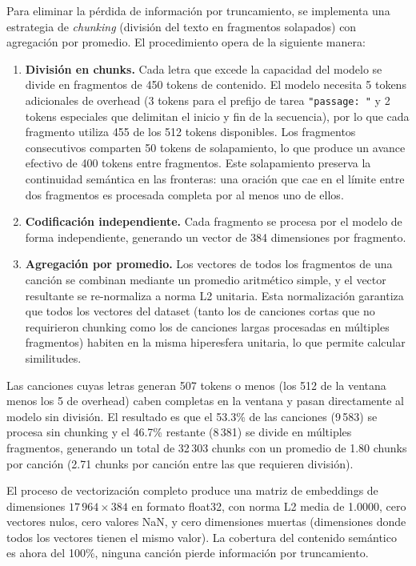 Para eliminar la pérdida de información por truncamiento, se implementa una estrategia de \textit{chunking} (división del texto en fragmentos solapados) con agregación por promedio. El procedimiento opera de la siguiente manera:

\begin{enumerate}[leftmargin=2em]
    \item \textbf{División en chunks.} Cada letra que excede la capacidad del modelo se divide en fragmentos de 450 tokens de contenido. El modelo necesita 5 tokens adicionales de overhead (3 tokens para el prefijo de tarea \texttt{"passage: "} y 2 tokens especiales que delimitan el inicio y fin de la secuencia), por lo que cada fragmento utiliza 455 de los 512 tokens disponibles. Los fragmentos consecutivos comparten 50 tokens de solapamiento, lo que produce un avance efectivo de 400 tokens entre fragmentos. Este solapamiento preserva la continuidad semántica en las fronteras: una oración que cae en el límite entre dos fragmentos es procesada completa por al menos uno de ellos.

    \item \textbf{Codificación independiente.} Cada fragmento se procesa por el modelo de forma independiente, generando un vector de 384 dimensiones por fragmento.

    \item \textbf{Agregación por promedio.} Los vectores de todos los fragmentos de una canción se combinan mediante un promedio aritmético simple, y el vector resultante se re-normaliza a norma L2 unitaria. Esta normalización garantiza que todos los vectores del dataset (tanto los de canciones cortas que no requirieron chunking como los de canciones largas procesadas en múltiples fragmentos) habiten en la misma hiperesfera unitaria, lo que permite calcular similitudes.
\end{enumerate}

Las canciones cuyas letras generan 507 tokens o menos (los 512 de la ventana menos los 5 de overhead) caben completas en la ventana y pasan directamente al modelo sin división. El resultado es que el 53.3\% de las canciones (9\,583) se procesa sin chunking y el 46.7\% restante (8\,381) se divide en múltiples fragmentos, generando un total de 32\,303 chunks con un promedio de 1.80 chunks por canción (2.71 chunks por canción entre las que requieren división).

El proceso de vectorización completo produce una matriz de embeddings de dimensiones $17\,964 \times 384$ en formato float32, con norma L2 media de 1.0000, cero vectores nulos, cero valores NaN, y cero dimensiones muertas (dimensiones donde todos los vectores tienen el mismo valor). La cobertura del contenido semántico es ahora del 100\%, ninguna canción pierde información por truncamiento.

